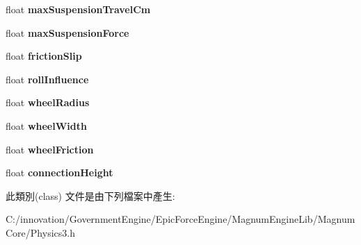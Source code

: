 \begin{DoxyCompactItemize}
\item 
float {\bfseries max\+Suspension\+Travel\+Cm}\hypertarget{class_i_dream_sky_1_1_physics3_1_1_vehicle_1_1_params_aad479dea05a64bb3a646fe4155d257ae}{}\label{class_i_dream_sky_1_1_physics3_1_1_vehicle_1_1_params_aad479dea05a64bb3a646fe4155d257ae}

\item 
float {\bfseries max\+Suspension\+Force}\hypertarget{class_i_dream_sky_1_1_physics3_1_1_vehicle_1_1_params_a815281586ff40633fb9fff3271727240}{}\label{class_i_dream_sky_1_1_physics3_1_1_vehicle_1_1_params_a815281586ff40633fb9fff3271727240}

\item 
float {\bfseries friction\+Slip}\hypertarget{class_i_dream_sky_1_1_physics3_1_1_vehicle_1_1_params_a6e299033ecfa57b56abe258ded3e81d4}{}\label{class_i_dream_sky_1_1_physics3_1_1_vehicle_1_1_params_a6e299033ecfa57b56abe258ded3e81d4}

\item 
float {\bfseries roll\+Influence}\hypertarget{class_i_dream_sky_1_1_physics3_1_1_vehicle_1_1_params_a1f5863d02b1bd6277215a0b9681b77a2}{}\label{class_i_dream_sky_1_1_physics3_1_1_vehicle_1_1_params_a1f5863d02b1bd6277215a0b9681b77a2}

\item 
float {\bfseries wheel\+Radius}\hypertarget{class_i_dream_sky_1_1_physics3_1_1_vehicle_1_1_params_adadd394a089a651f1a4538dec09ac1e8}{}\label{class_i_dream_sky_1_1_physics3_1_1_vehicle_1_1_params_adadd394a089a651f1a4538dec09ac1e8}

\item 
float {\bfseries wheel\+Width}\hypertarget{class_i_dream_sky_1_1_physics3_1_1_vehicle_1_1_params_ae892d5ac73dc9e7dce323d24187c4027}{}\label{class_i_dream_sky_1_1_physics3_1_1_vehicle_1_1_params_ae892d5ac73dc9e7dce323d24187c4027}

\item 
float {\bfseries wheel\+Friction}\hypertarget{class_i_dream_sky_1_1_physics3_1_1_vehicle_1_1_params_a70f89e92b3cb6f4166f0a59ab0ed0f7f}{}\label{class_i_dream_sky_1_1_physics3_1_1_vehicle_1_1_params_a70f89e92b3cb6f4166f0a59ab0ed0f7f}

\item 
float {\bfseries connection\+Height}\hypertarget{class_i_dream_sky_1_1_physics3_1_1_vehicle_1_1_params_a958b2cca429903de59311299cd0d551e}{}\label{class_i_dream_sky_1_1_physics3_1_1_vehicle_1_1_params_a958b2cca429903de59311299cd0d551e}

\end{DoxyCompactItemize}


此類別(class) 文件是由下列檔案中產生\+:\begin{DoxyCompactItemize}
\item 
C\+:/innovation/\+Government\+Engine/\+Epic\+Force\+Engine/\+Magnum\+Engine\+Lib/\+Magnum\+Core/Physics3.\+h\end{DoxyCompactItemize}

